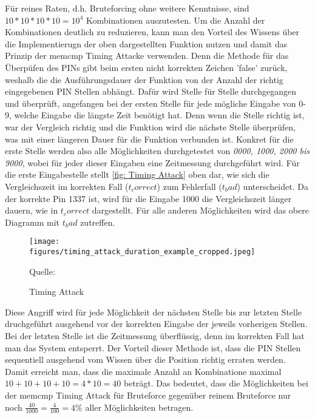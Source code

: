 \documentclass[a4paper,
DIV=13,
12pt,
BCOR=10mm,
department=FakIM,
oneside,
parskip=half,
automark,
listof=totocnumbered,
bibliography=totocnumbered,
acronym=totocnumbered
] {OTHRartcl}
\newcommand*{\quelle}[1]{\par\raggedleft\footnotesize Quelle:~#1}
\begin{document}
Für reines Raten, d.h. Bruteforcing ohne weitere Kenntnisse, sind $ 10*10*10*10 = 10^4 $ Kombinationen auszutesten.
Um die Anzahl der Kombinationen deutlich zu reduzieren, kann man den Vorteil des Wissens über die Implementierugn der oben dargestellten Funktion nutzen und damit das Prinzip der memcmp Timing Attacke verwenden.
Denn die Methode für das Überpüfen des PINs gibt beim ersten nicht korrekten Zeichen 'false' zurück, weshalb die die Ausführungsdauer der
Funktion von der Anzahl der richtig eingegebenen PIN Stellen abhängt.
Dafür wird Stelle für Stelle durchgegangen und überprüft, angefangen bei der ersten Stelle für jede mögliche Eingabe von 0-9, welche Eingabe die längste Zeit benötigt hat.
Denn wenn die Stelle richtig ist, war der Vergleich richtig und die Funktion wird die nächste Stelle überprüfen, was mit einer längeren Dauer für die Funktion
verbunden ist.
Konkret für die erste Stelle werden also alle Möglichkeiten durchgetestet von \textit{0000, 1000, 2000 bis 9000}, wobei für jeder dieser Eingaben
eine Zeitmessung durchgeführt wird.
Für die erste Eingabestelle stellt \autoref{fig: Timing Attack} oben dar, wie sich die Vergleichszeit im
korrekten Fall ($t_correct$) zum Fehlerfall ($t_bad$) unterscheidet.
Da der korrekte Pin 1337 ist, wird für die Eingabe 1000 die Vergleichszeit länger dauern, wie in $t_correct$ dargestellt.
Für alle anderen Möglichkeiten wird das obere Diagramm mit $t_bad$ zutreffen.
\begin{figure}[ht!]
  \begin{center}
    \texttt{[image: figures/timing\_attack\_duration\_example\_cropped.jpeg]}
    \quelle{\cite{Hardware Hacking Handbook}}
    \caption{Timing Attack}
    \label{fig: Timing Attack}
  \end{center}
\end{figure}
Diese Angriff wird für jede Möglichkeit der nächsten Stelle bis zur letzten Stelle druchgeführt ausgehend vor der korrekten Eingabe der jeweils vorherigen Stellen.
Bei der letzten Stelle ist die Zeitmessung überflüssig, denn im korrekten Fall hat man das System entsperrt.
Der Vorteil dieser Methode ist, dass die PIN Stellen sequentiell ausgehend vom Wissen über die Position richtig erraten werden.
Damit erreicht man, dass die maximale Anzahl an Kombinatione maximal $10+10+10+10 = 4*10 = 40 $ beträgt.
Das bedeutet, dass die Möglichkeiten bei der memcmp Timing Attack für Bruteforce gegenüber reinem Bruteforce nur noch $\frac{40}{1000} = \frac{4}{100} = 4\% $
aller Möglichkeiten betragen. \cite{Hardware Hacking Handbook}
\end{document}
